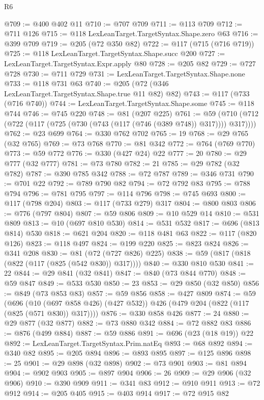 \begin{lexlean}{R6}
\begin{coremodule}
@709 := @400 @402 @11
@710 := @707 @709
@711 := @113 @709
@712 := @711 @126
@715 := @118 LexLeanTarget.TargetSyntax.Shape.zero @63
@716 := @399 @709
@719 := @205 (@72 @350 @82)
@722 := @117 (@715 (@716 @719))
@725 := @118 LexLeanTarget.TargetSyntax.Shape.succ @200
@727 := LexLeanTarget.TargetSyntax.Expr.apply @80
@728 := @205 @82
@729 := @727 @728
@730 := @711 @729
@731 := LexLeanTarget.TargetSyntax.Shape.none
@733 := @118 @731 @63
@740 := @205 (@72 (@346 LexLeanTarget.TargetSyntax.Shape.true @11 @82) @82)
@743 := @117 (@733 (@716 @740))
@744 := LexLeanTarget.TargetSyntax.Shape.some
@745 := @118 @744
@746 := @745 @220
@748 := @81 (@207 @225)
@761 := @59 (@710 (@712 (@722 (@117 (@725 (@730 (@743 (@117 (@746 (@389 @748)) @317)))) @317))))
@762 := @23 @699
@764 := @330 @762 @702
@765 := 19
@768 := @29 @765 (@32 @765)
@769 := @73 @768
@770 := @81 @342
@772 := @764 (@769 @770)
@773 := @59 @772
@776 := @330 (@427 @24) @22
@777 := 20
@780 := @29 @777 (@32 @777)
@781 := @73 @780
@782 := 21
@785 := @29 @782 (@32 @782)
@787 := @390 @785 @342
@788 := @72 @787
@789 := @346 @731
@790 := @701 @22
@792 := @789 @790 @82
@794 := @72 @792 @83
@795 := @788 @794
@796 := @781 @795
@797 := @114 @796
@798 := @745 @693
@800 := @117 (@798 @204)
@803 := @117 (@733 @279) @317
@804 := @800 @803
@806 := @776 (@797 @804)
@807 := @59 @806
@809 := @10 @529 @14
@810 := @531 @809
@813 := @10 (@697 @810 @530)
@814 := @531 @532
@817 := @696 (@813 @814) @530
@818 := @621 @204
@820 := @118 @481 @63
@822 := @117 (@820 @126)
@823 := @118 @497
@824 := @199 @220
@825 := @823 @824
@826 := @341 @208
@830 := @81 (@72 (@727 @826) @225)
@838 := @59 (@817 (@818 (@822 (@117 (@825 (@542 @830)) @317))))
@840 := @330 @810 @530
@841 := 22
@844 := @29 @841 (@32 @841)
@847 := @840 (@73 @844 @770)
@848 := @59 @847
@849 := @533 @530
@850 := 23
@853 := @29 @850 (@32 @850)
@856 := @849 (@73 @853 @83)
@857 := @59 @856
@858 := @427 @809
@874 := @59
    (@696 (@10 (@697 @858 @426) (@427 @532)) @426 (@479 @204 (@822 (@117 (@825 (@571 @830)) @317))))
@876 := @330 @858 @426
@877 := 24
@880 := @29 @877 (@32 @877)
@882 := @73 @880 @342
@884 := @72 @882 @83
@886 := @876 (@499 @884)
@887 := @59 @886
@891 := @696 (@23 (@18 @19)) @22
@892 := LexLeanTarget.TargetSyntax.Prim.natEq
@893 := @68 @892
@894 := @340 @82
@895 := @205 @894
@896 := @893 @895
@897 := @125 @896
@898 := 25
@901 := @29 @898 (@32 @898)
@902 := @73 @901
@903 := @81 @894
@904 := @902 @903
@905 := @897 @904
@906 := 26
@909 := @29 @906 (@32 @906)
@910 := @390 @909
@911 := @341 @83
@912 := @910 @911
@913 := @72 @912
@914 := @205 @405
@915 := @403 @914
@917 := @72 @915 @82

\end{coremodule}
\end{lexlean}
